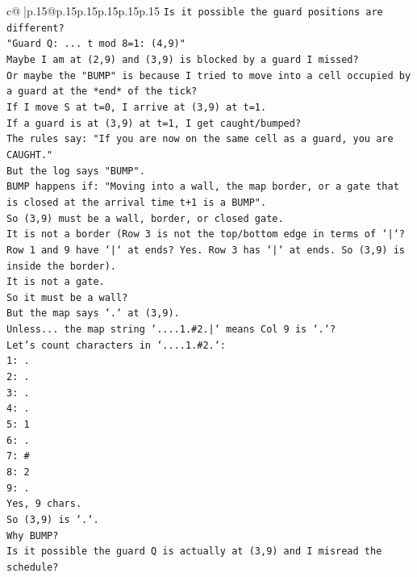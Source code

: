 \documentclass{article}
\begin{document}
{\begin{supertabular}{c@{$\;$}|p{.15\linewidth}@{}p{.15\linewidth}p{.15\linewidth}p{.15\linewidth}p{.15\linewidth}p{.15\linewidth}}
{{{\texttt{Is it possible the guard positions are different?} \\
\texttt{"Guard Q: ... t mod 8=1: (4,9)"} \\
\texttt{Maybe I am at (2,9) and (3,9) is blocked by a guard I missed?} \\
\texttt{Or maybe the "BUMP" is because I tried to move into a cell occupied by a guard at the *end* of the tick?} \\
\texttt{If I move S at t=0, I arrive at (3,9) at t=1.} \\
\texttt{If a guard is at (3,9) at t=1, I get caught/bumped?} \\
\texttt{The rules say: "If you are now on the same cell as a guard, you are CAUGHT."} \\
\texttt{But the log says "BUMP".} \\
\texttt{BUMP happens if: "Moving into a wall, the map border, or a gate that is closed at the arrival time t+1 is a BUMP".} \\
\texttt{So (3,9) must be a wall, border, or closed gate.} \\
\texttt{It is not a border (Row 3 is not the top/bottom edge in terms of `|`? Row 1 and 9 have `|` at ends? Yes. Row 3 has `|` at ends. So (3,9) is inside the border).} \\
\texttt{It is not a gate.} \\
\texttt{So it must be a wall?} \\
\texttt{But the map says `.` at (3,9).} \\
\texttt{Unless... the map string `....1.\#2.|` means Col 9 is `.`?} \\
\texttt{Let's count characters in `....1.\#2.`:} \\
\texttt{1: .} \\
\texttt{2: .} \\
\texttt{3: .} \\
\texttt{4: .} \\
\texttt{5: 1} \\
\texttt{6: .} \\
\texttt{7: \#} \\
\texttt{8: 2} \\
\texttt{9: .} \\
\texttt{Yes, 9 chars.} \\
\texttt{So (3,9) is `.`.} \\
\texttt{Why BUMP?} \\
\texttt{Is it possible the guard Q is actually at (3,9) and I misread the schedule?} \\
}}}
\end{supertabular}}
\end{document}
